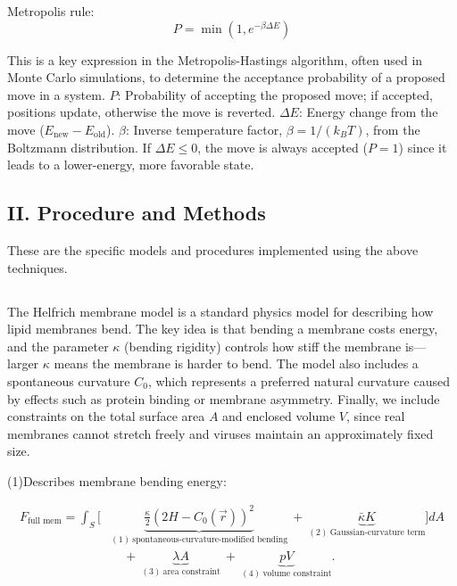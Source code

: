 \documentclass[12pt]{article}
\begin{document}
\begin{flushleft}
Metropolis rule:
\begin{equation}
P = \min\left(1, e^{-\beta \Delta E}\right)
\end{equation}

This is a key expression in the Metropolis-Hastings algorithm, often used in Monte Carlo simulations, to determine the acceptance probability of a proposed move in a system. $P$: Probability of accepting the proposed move; if accepted, positions update, otherwise the move is reverted.
$\Delta E$: Energy change from the move ($E_{\text{new}} - E_{\text{old}}$).
$\beta$: Inverse temperature factor, $\beta = 1 / (k_B T)$, from the Boltzmann distribution. 
If $\Delta E \leq 0$, the move is always accepted ($P = 1$) since it leads to a lower-energy, more favorable state.
 
\vspace{-1em} 
\subsection*{II. Procedure and Methods} 


These are the specific models and procedures implemented using the above techniques.\\

\vspace{-1em} 

  \subsection*{}

The Helfrich membrane model is a standard physics model for describing how lipid membranes bend.
The key idea is that bending a membrane costs energy, and the parameter $\kappa$ (bending rigidity)
controls how stiff the membrane is---larger $\kappa$ means the membrane is harder to bend.
The model also includes a spontaneous curvature $C_0$, which represents a preferred natural curvature
caused by effects such as protein binding or membrane asymmetry.
Finally, we include constraints on the total surface area $A$ and enclosed volume $V$, since real
membranes cannot stretch freely and viruses maintain an approximately fixed size.









  	 \indent\indent(1)Describes membrane bending energy:

\vspace{-1em}
\begin{align}
F_\text{full mem} = \int_S \Bigg[
&\underbrace{\frac{\kappa}{2} \left(2H - C_0(\vec{r}) \right)^2}_{(1)\ \text{spontaneous-curvature-modified bending}} 
\ + \ 
\underbrace{\bar{\kappa} K}_{(2)\ \text{Gaussian-curvature term}} 
\Bigg] dA \nonumber \\
&\quad + \ 
\underbrace{\lambda A}_{(3)\ \text{area constraint}} 
\ + \ 
\underbrace{p V}_{(4)\ \text{volume constraint}}.
\end{align}


\end{flushleft}
\end{document}
